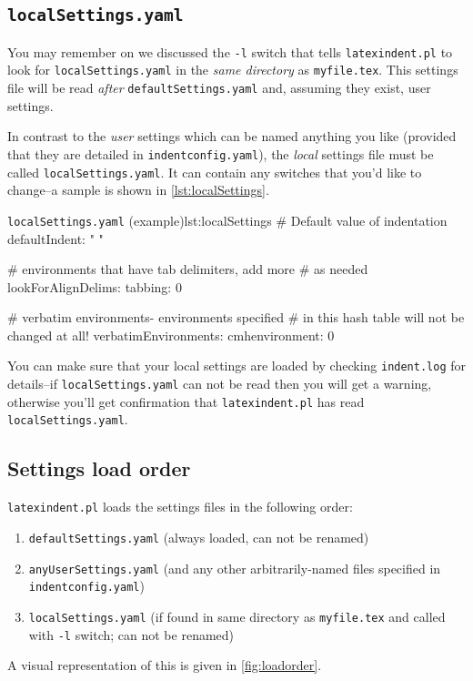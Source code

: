 \documentclass[11pt]{article}
\begin{document}
\subsection{\lstinline!localSettings.yaml!}
You may remember on  we discussed the \lstinline!-l! switch
that tells \lstinline!latexindent.pl! to look for \lstinline!localSettings.yaml! in the
\emph{same directory} as \lstinline!myfile.tex!. This settings file will
be read \emph{after} \lstinline!defaultSettings.yaml! and, assuming they exist,
user settings.

In contrast to the \emph{user} settings which can be named anything you like (provided that
they are detailed in \lstinline!indentconfig.yaml!), the \emph{local} settings file
must be called \lstinline!localSettings.yaml!. It can contain any switches that you'd
like to change--a sample is shown in \cref{lst:localSettings}.

\begin{cmhlistings}[style=yaml]{\lstinline!localSettings.yaml! (example)}{lst:localSettings}
# Default value of indentation
defaultIndent: " "

# environments that have tab delimiters, add more
# as needed
lookForAlignDelims:
   tabbing: 0

#  verbatim environments- environments specified
#  in this hash table will not be changed at all!
verbatimEnvironments:
    cmhenvironment: 0
\end{cmhlistings}

You can make sure that your local settings are loaded by checking \lstinline!indent.log!
for details--if \lstinline!localSettings.yaml! can not be read then you will
get a warning, otherwise you'll get confirmation that
\lstinline!latexindent.pl! has read \lstinline!localSettings.yaml!.

\subsection{Settings load order}\label{sec:loadorder}
\lstinline!latexindent.pl! loads the settings files in the following order:
\begin{enumerate}
	\item \lstinline!defaultSettings.yaml! (always loaded, can not be renamed)
	\item \lstinline!anyUserSettings.yaml! (and any other arbitrarily-named files specified in \lstinline!indentconfig.yaml!)
	\item \lstinline!localSettings.yaml! (if found in same directory as \lstinline!myfile.tex! and called
		with \lstinline!-l! switch; can not be renamed)
\end{enumerate}
A visual representation of this is given in \cref{fig:loadorder}.
\end{document}
